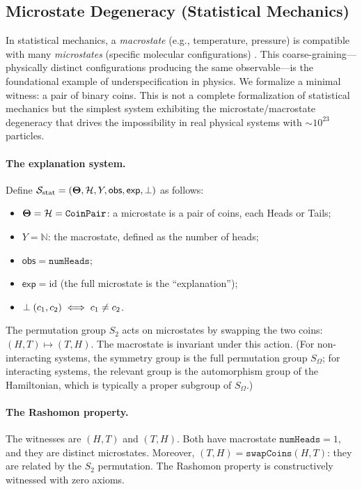\subsection{Microstate Degeneracy (Statistical Mechanics)}
\label{sec:instance-stat-mech}

In statistical mechanics, a \emph{macrostate} (e.g., temperature, pressure)
is compatible with many \emph{microstates} (specific molecular configurations)
\citep{jaynes1957information}.
This coarse-graining---physically distinct configurations producing the same
observable---is the foundational example of underspecification in physics.
We formalize a minimal witness: a pair of binary coins.  This is not a
complete formalization of statistical mechanics but the simplest system
exhibiting the microstate/macrostate degeneracy that drives the impossibility
in real physical systems with $\sim 10^{23}$ particles.

\paragraph{The explanation system.}
Define $\mathcal{S}_{\mathrm{stat}} = (\mathbf{\Theta}, \mathcal{H}, Y, \mathsf{obs},
\mathsf{exp}, \perp)$ as follows:
\begin{itemize}
  \item $\mathbf{\Theta} = \mathcal{H} = \texttt{CoinPair}$: a microstate is a pair of coins,
    each Heads or Tails;
  \item $Y = \mathbb{N}$: the macrostate, defined as the number of heads;
  \item $\mathsf{obs} = \texttt{numHeads}$;
  \item $\mathsf{exp} = \mathrm{id}$ (the full microstate is the
    ``explanation'');
  \item $\perp(c_1, c_2) \iff c_1 \ne c_2$.
\end{itemize}

The permutation group $S_2$ acts on microstates by swapping the two coins:
$(H,T) \mapsto (T,H)$.  The macrostate is invariant under this action.
(For non-interacting systems, the symmetry group is the full permutation group $S_\Omega$; for interacting systems, the relevant group is the automorphism group of the Hamiltonian, which is typically a proper subgroup of $S_\Omega$.)

\paragraph{The Rashomon property.}
The witnesses are $(H,T)$ and $(T,H)$.  Both have macrostate $\texttt{numHeads} = 1$,
and they are distinct microstates.  Moreover, $(T,H) = \texttt{swapCoins}(H,T)$:
they are related by the $S_2$ permutation.  The Rashomon property is constructively
witnessed with zero axioms.

